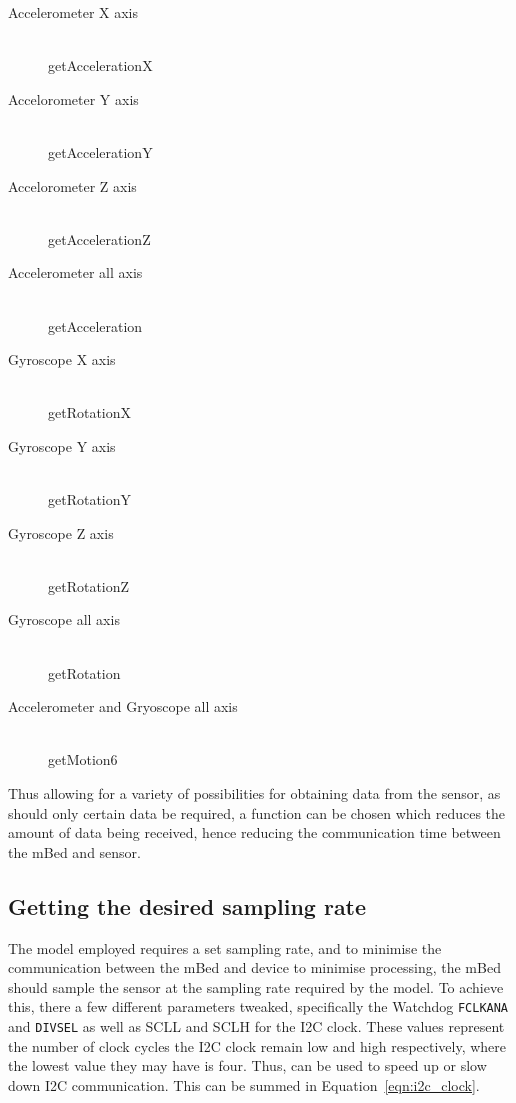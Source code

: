 \begin{description}
	\item[Accelerometer X axis] \hfill \\ getAccelerationX
	\item[Accelorometer Y axis] \hfill \\ getAccelerationY
	\item[Accelorometer Z axis] \hfill \\ getAccelerationZ
	\item[Accelerometer all axis] \hfill \\ getAcceleration
	\item[Gyroscope X axis] \hfill \\ getRotationX
	\item[Gyroscope Y axis] \hfill \\ getRotationY
	\item[Gyroscope Z axis] \hfill \\ getRotationZ
	\item[Gyroscope all axis] \hfill \\ getRotation
	\item[Accelerometer and Gryoscope all axis] \hfill \\ getMotion6
\end{description}


Thus allowing for a variety of possibilities for obtaining data from the sensor, as should only certain data be required, a function can be chosen which reduces the amount of data being received, hence reducing the communication time between the mBed and sensor.

\subsection{Getting the desired sampling rate}

The model employed requires a set sampling rate, and to minimise the communication between the mBed and device to minimise processing, the mBed should sample the sensor at the sampling rate required by the model. To achieve this, there a few different parameters tweaked, specifically the Watchdog \verb|FCLKANA| and \verb|DIVSEL| as well as SCLL and SCLH for the I2C clock. These values represent the number of clock cycles the I2C clock remain low and high respectively, where the lowest value they may have is four. Thus, can be used to speed up or slow down I2C communication. \cite{mbed_datasheet} This can be summed in Equation~\ref{eqn:i2c_clock}.


